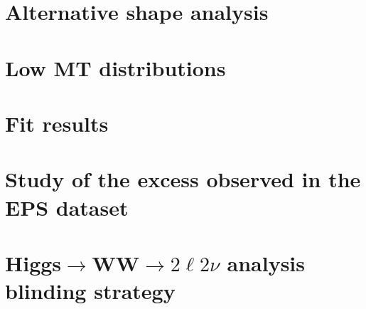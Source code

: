 \documentclass{cmspaper}
\begin{document}
\clearpage
  \section{Alternative shape analysis}
     \label{app:appendix_altshape}

\clearpage
  \section{Low MT distributions}
     \label{app:appendix_lowmt}
 
\clearpage
  \section{Fit results}
     \label{app:appendix_fit}

\clearpage
  \section{Study of the excess observed in the EPS dataset}
     \label{app:limits_eps}

%  
\section{Higgs$\to$WW$\to2\ell2\nu$ analysis blinding strategy}
     \label{app:blinding}
     
\end{document}
